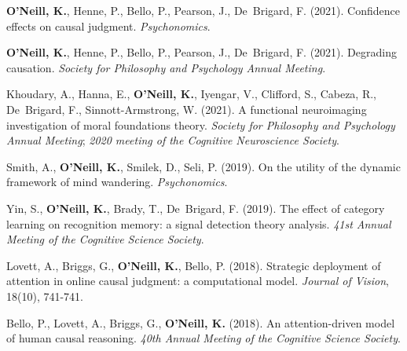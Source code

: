 \textbf{O'Neill, K.}, Henne, P., Bello, P., Pearson, J., De~Brigard,
F. (2021). Confidence effects on causal judgment. \emph{Psychonomics}.

\textbf{O'Neill, K.}, Henne, P., Bello, P., Pearson, J., De~Brigard,
F. (2021). Degrading causation. \emph{Society for Philosophy and
Psychology Annual Meeting}.

Khoudary, A., Hanna, E., \textbf{O’Neill, K.}, Iyengar, V., Clifford,
S., Cabeza, R., De~Brigard, F., Sinnott-Armstrong, W. (2021). A
functional neuroimaging investigation of moral foundations
theory. \emph{Society for Philosophy and Psychology Annual Meeting};
\emph{2020 meeting of the Cognitive Neuroscience Society}.

Smith, A., \textbf{O'Neill, K.}, Smilek, D., Seli, P. (2019). On the
utility of the dynamic framework of mind
wandering. \emph{Psychonomics}.

Yin, S., \textbf{O'Neill, K.}, Brady, T., De~Brigard, F. (2019). The
effect of category learning on recognition memory: a signal detection
theory analysis. \emph{41st Annual Meeting of the Cognitive Science
Society}.

Lovett, A., Briggs, G., \textbf{O'Neill, K.}, Bello,
P. (2018). Strategic deployment of attention in online causal
judgment: a computational model. \emph{Journal of Vision}, 18(10),
741-741.

Bello, P., Lovett, A., Briggs, G., \textbf{O'Neill, K.} (2018). An
attention-driven model of human causal reasoning. \emph{40th Annual
Meeting of the Cognitive Science Society}.
